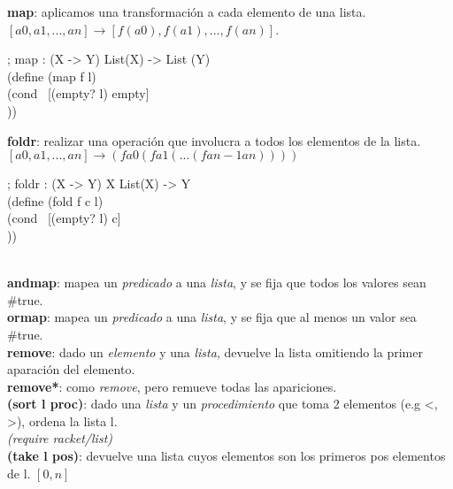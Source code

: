 \documentclass[11pt,a4paper]{article}
\begin{document}
\noindent \textbf{map}: aplicamos una transformaci\'on a cada elemento de una lista. $[a0, a1, ..., an] \rightarrow [f(a0), f(a1), ..., f(an)]$.
\begin{siderules}
; map : (X -> Y) List(X) -> List (Y)\\
(define (map f l)\\
\indent \indent \indent (cond \ [(empty? l) empty]\\
\indent \indent \indent \indent {}))
\end{siderules}

\newpage

\noindent \textbf{foldr}: realizar una operaci\'on que involucra a todos los elementos de la lista. $[a0, a1, ..., an] \rightarrow (f a0 (f a1 (... (f an-1 an))))$
\begin{siderules}
; foldr : (X -> Y) X List(X) -> Y\\
(define (fold f c l)\\
\indent \indent \indent (cond \ [(empty? l) c]\\
\indent \indent \indent \indent {}))
\end{siderules}

\noindent \dotfill\\

\noindent \textbf{andmap}: mapea un \textit{predicado} a una \textit{lista}, y se fija que todos los valores sean \#true.\\ 

\noindent \textbf{ormap}: mapea un \textit{predicado} a una \textit{lista}, y se fija que al menos un valor sea \#true.\\

\noindent \textbf{remove}: dado un \textit{elemento} y una \textit{lista}, devuelve la lista omitiendo la primer aparaci\'on del elemento.\\

\noindent \textbf{remove*}: como \textit{remove}, pero remueve todas las apariciones.\\

\noindent \textbf{(sort l proc)}: dado una \textit{lista} y un \textit{procedimiento} que toma 2 elementos (e.g <, >), ordena la lista l.\\

\textit{(require racket/list)}\\

\noindent \textbf{(take l pos)}: devuelve una lista cuyos elementos son los primeros pos elementos de l. $[0,n]$\\
\end{document}
